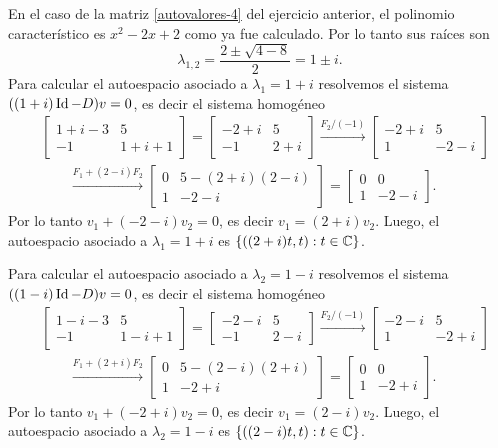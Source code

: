 \begin{enumerate}[topsep=6pt,itemsep=.4cm]
    \rta
    
    En el caso de la matriz \ref{autovalores-4} del ejercicio anterior, el polinomio característico es $x^2-2x+2$ como ya fue calculado. 
    Por lo tanto sus raíces son
    $$
    \lambda_{1,2} = \frac{2\pm\sqrt{4-8}}{2} = 1\pm i.
    $$
    Para calcular el autoespacio asociado a $\lambda_1 = 1+i$ resolvemos el sistema  $((1+i)\operatorname{Id}-D)v=0$, es decir el sistema homogéneo
    \begin{align*}
        &\begin{bmatrix} 1+i-3 & 5\\ -1 & 1+i+1 \end{bmatrix} = \begin{bmatrix} -2+i & 5\\ -1 & 2+i \end{bmatrix} \stackrel{F_2/(-1)}{\longrightarrow} \begin{bmatrix} -2+i & 5\\ 1 & -2-i \end{bmatrix} \\
        &\qquad\stackrel{F_1 + (2-i) F_2}{\longrightarrow} \begin{bmatrix} 0 & 5-(2+i)(2-i)\\ 1 & -2-i \end{bmatrix} =\begin{bmatrix} 0 & 0\\ 1 & -2-i \end{bmatrix}.
    \end{align*}
    Por lo tanto $v_1 +(-2-i)v_2=0$, es decir $v_1 = (2+i)v_2$. Luego, el autoespacio asociado a $\lambda_1 = 1+i$ es $\{((2+i)t,t): t \in \mathbb C\}$.

    Para calcular el autoespacio asociado a $\lambda_2 = 1-i$ resolvemos el sistema  $((1-i)\operatorname{Id}-D)v=0$, es decir el sistema homogéneo
    \begin{align*}
        &\begin{bmatrix} 1-i-3 & 5\\ -1 & 1-i+1 \end{bmatrix} = \begin{bmatrix} -2-i & 5\\ -1 & 2-i \end{bmatrix} \stackrel{F_2/(-1)}{\longrightarrow} \begin{bmatrix} -2-i & 5\\ 1 & -2+i \end{bmatrix} \\
        &\qquad\stackrel{F_1 + (2+i) F_2}{\longrightarrow} \begin{bmatrix} 0 & 5-(2-i)(2+i)\\ 1 & -2+i \end{bmatrix} =\begin{bmatrix} 0 & 0\\ 1 & -2+i \end{bmatrix}.
    \end{align*}
    Por lo tanto $v_1 +(-2+i)v_2=0$, es decir $v_1 = (2-i)v_2$. Luego, el autoespacio asociado a $\lambda_2 = 1-i$ es $\{((2-i)t,t): t \in \mathbb C\}$.


\end{enumerate}
